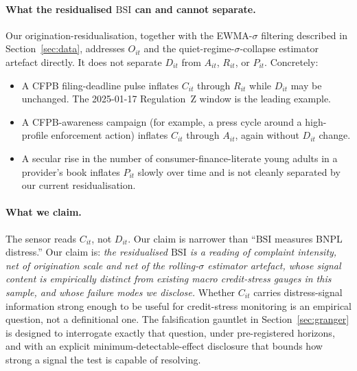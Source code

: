 \documentclass[11pt,letterpaper]{article}
\newcommand{\bsi}{\text{BSI}}
\begin{document}
\paragraph{What the residualised $\bsi$ can and cannot
separate.} Our origination-residualisation, together with the
EWMA-$\sigma$ filtering described in Section~\ref{sec:data},
addresses $O_{it}$ and the quiet-regime-$\sigma$-collapse
estimator artefact directly. It does not separate $D_{it}$
from $A_{it}$, $R_{it}$, or $P_{it}$. Concretely:

\begin{itemize}[leftmargin=*]
\item A CFPB filing-deadline pulse inflates $C_{it}$ through
      $R_{it}$ while $D_{it}$ may be unchanged. The
      2025-01-17 Regulation~Z window is the leading example.
\item A CFPB-awareness campaign (for example, a press cycle
      around a high-profile enforcement action) inflates
      $C_{it}$ through $A_{it}$, again without $D_{it}$ change.
\item A secular rise in the number of consumer-finance-literate
      young adults in a provider's book inflates $P_{it}$
      slowly over time and is not cleanly separated by our
      current residualisation.
\end{itemize}

\paragraph{What we claim.} The sensor reads
$C_{it}$, not $D_{it}$. Our claim is narrower than ``$\bsi$
measures BNPL distress.'' Our claim is: \emph{the
residualised $\bsi$ is a reading of complaint intensity, net of
origination scale and net of the rolling-$\sigma$ estimator
artefact, whose signal content is empirically distinct from
existing macro credit-stress gauges in this sample, and whose
failure modes we disclose.} Whether $C_{it}$ carries
distress-signal information strong enough to be useful for
credit-stress monitoring is an empirical question, not a
definitional one. The falsification gauntlet in
Section~\ref{sec:granger} is designed to interrogate exactly
that question, under pre-registered horizons, and with an
explicit minimum-detectable-effect disclosure that bounds how
strong a signal the test is capable of resolving.
\end{document}
